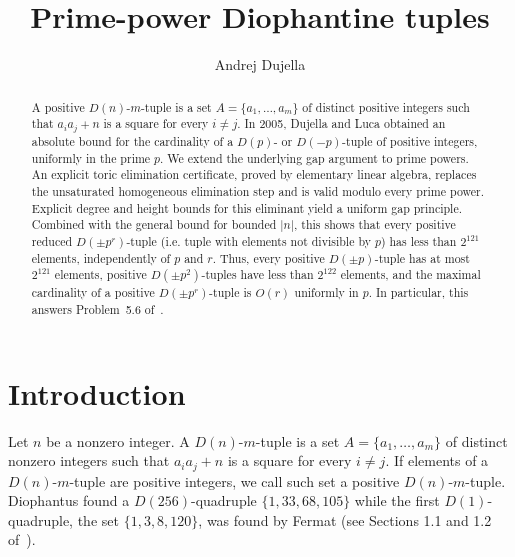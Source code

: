 \documentclass[11pt]{amsart}
\theoremstyle{remark}
\begin{document}
\title[Prime-power Diophantine tuples]{Prime-power Diophantine tuples}
\author{Andrej Dujella}



\begin{abstract}
A positive $D(n)$-$m$-tuple is a set
$A=\{a_1,\ldots,a_m\}$ of distinct positive integers such that
$a_i a_j+n$ is a square for every $i\ne j$. 
In 2005, Dujella and Luca obtained an absolute bound for the cardinality of a
$D(p)$- or $D(-p)$-tuple of positive integers, uniformly in the prime $p$.
We extend the underlying gap argument to prime powers. 
An explicit toric elimination certificate, proved by
elementary linear algebra, replaces the unsaturated homogeneous elimination
step and is valid modulo every prime power. Explicit degree and height bounds
for this eliminant yield a uniform gap principle. Combined with the general
bound for bounded $|n|$, this shows that every positive reduced
$D(\pm p^r)$-tuple (i.e. tuple with elements not divisible by $p$) 
has less than $2^{121}$ elements, independently of $p$
and $r$. Thus, every positive $D(\pm p)$-tuple has at most $2^{121}$
elements, positive $D(\pm p^2)$-tuples have less than $2^{122}$ elements,
and the maximal cardinality of a positive $D(\pm p^r)$-tuple is $O(r)$
uniformly in $p$. In particular, this answers Problem~5.6 of~\cite{OpenProblems}.
\end{abstract}

\maketitle

\section{Introduction}

Let $n$ be a nonzero integer. A $D(n)$-$m$-tuple is a set
$A=\{a_1,\ldots,a_m\}$ of distinct nonzero integers such that
$a_i a_j+n$ is a square for every $i\ne j$. 
If elements of a $D(n)$-$m$-tuple are positive integers, 
we call such set a positive $D(n)$-$m$-tuple. 
Diophantus found a $D(256)$-quadruple $\{1, 33, 68, 105\}$
while the first $D(1)$-quadruple, the set $\{1, 3, 8, 120\}$, was found by Fermat 
(see Sections 1.1 and 1.2 of~\cite{Dbook}). 
\end{document}
